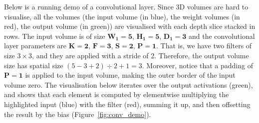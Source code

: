Below is a running demo of a convolutional layer. Since 3D volumes are hard to
visualise, all the volumes (the input volume (in blue), the weight volumes (in
red), the output volume (in green)) are visualised with each depth slice
stacked in rows. The input volume is of size $\boldsymbol{W_1 = 5}$,
$\boldsymbol{H_1 = 5}$, $\boldsymbol{D_1 = 3}$ and the convolutional layer
parameters are $\boldsymbol{K = 2}$, $\boldsymbol{F = 3}$,
$\boldsymbol{S = 2}$, $\boldsymbol{P = 1}$. That is, we have two filters of
size $3 \times 3$, and they are applied with a stride of 2. Therefore, the
output volume size has spatial size $(5 - 3 + 2) \div 2 + 1 = 3$. Moreover,
notice that a padding of $\boldsymbol{P = 1}$ is applied to the input volume,
making the outer border of the input volume zero. The visualisation below
iterates over the output activations (green), and shows that each element
is computed by elementwise multiplying the highlighted input (blue) with the
filter (red), summing it up, and then offsetting the result by the bias
(Figure~\ref{fig:conv_demo}).
